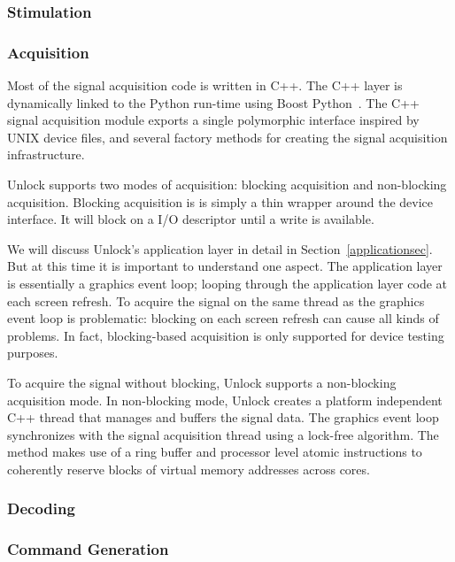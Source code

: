 \documentclass[11pt]{article}
\begin{document}
\subsubsection{Stimulation}

\subsubsection{Acquisition}

Most of the signal acquisition code is written in C++.  The C++ layer is dynamically linked to the Python run-time using Boost Python~\cite{boostpython}.  The C++ signal acquisition module exports a single polymorphic interface inspired by UNIX device files, and several factory methods for creating the signal acquisition infrastructure.

Unlock supports two modes of acquisition: blocking acquisition and non-blocking acquisition.  Blocking acquisition is is simply a thin wrapper around the device interface.  It will block on a I/O descriptor until a write is available.

We will discuss Unlock's application layer in detail in Section~\ref{applicationsec}.  But at this time it is important to understand one aspect.  The application layer is essentially a graphics event loop; looping through the application layer code at each screen refresh.  To acquire the signal on the same thread as the graphics event loop is problematic: blocking on each screen refresh can cause all kinds of problems.  In fact, blocking-based acquisition is only supported for device testing purposes. 

To acquire the signal without blocking, Unlock supports a non-blocking acquisition mode.  In non-blocking mode, Unlock creates a platform independent C++ thread that manages and buffers the signal data.  The graphics event loop synchronizes with the signal acquisition thread using a lock-free algorithm.  The method makes use of a ring buffer and processor level atomic instructions to coherently reserve blocks of virtual memory addresses across cores.

\subsubsection{Decoding}

\subsubsection{Command Generation}
\end{document}
